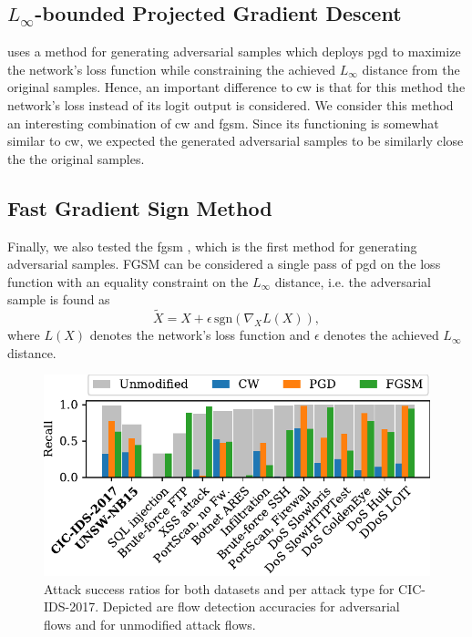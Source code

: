\documentclass[conference]{IEEEtran}
\begin{document}
\subsection{$L_\infty$-bounded Projected Gradient Descent}
\cite{madry_towards_2018} uses a method for generating adversarial samples which deploys \gls{pgd}  to maximize the network's loss function while constraining the achieved $L_\infty$ distance from the original samples. Hence, an important difference to \gls{cw} is that for this method the network's loss instead of its logit output is considered.
We consider this method an interesting combination of \gls{cw} and \gls{fgsm}.
Since its functioning is somewhat similar to \gls{cw}, we expected the generated adversarial samples to be similarly close the the original samples.

\subsection{Fast Gradient Sign Method}
Finally, we also tested the \gls{fgsm} %
 \cite{goodfellow_explaining_2015}, which is the first method for generating adversarial samples. FGSM can be considered a single pass of \gls{pgd} on the loss function with an equality constraint on the $L_\infty$ distance, i.e. the adversarial sample is found as
\begin{equation}
\tilde X = X + \epsilon \, \text{sgn}( \nabla_X L(X)),
\end{equation}
where $L(X)$ denotes the network's loss function and $\epsilon$ denotes the achieved $L_\infty$ distance.

\begin{figure}[h]
\includegraphics[width=\columnwidth]{../plots/adv_comparison/adv_comparison_17.pdf}
\caption{Attack success ratios for both datasets and per attack type for CIC-IDS-2017. Depicted are flow detection accuracies for adversarial flows and for unmodified attack flows.}
\label{fig:adv_per_family}
\end{figure}
\end{document}
